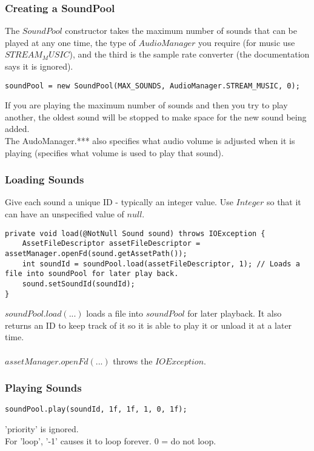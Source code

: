 \documentclass[]{article}
\begin{document}
\subsubsection{Creating a SoundPool}
The $SoundPool$ constructor takes the maximum number of sounds that can be played at any one time, the type of $AudioManager$ you require (for music use $STREAM_MUSIC$), and the third is the sample rate converter (the documentation says it is ignored).
\begin{lstlisting}
soundPool = new SoundPool(MAX_SOUNDS, AudioManager.STREAM_MUSIC, 0);
\end{lstlisting}
If you are playing the maximum number of sounds and then you try to play another, the oldest sound will be stopped to make space for the new sound being added.
\\
The AudoManager.*** also specifies what audio volume is adjusted when it is playing (specifies what volume is used to play that sound).

\subsubsection{Loading Sounds}
Give each sound a unique ID - typically an integer value.  Use $Integer$ so that it can have an unspecified value of $null$.
\begin{lstlisting}
private void load(@NotNull Sound sound) throws IOException {
	AssetFileDescriptor assetFileDescriptor = assetManager.openFd(sound.getAssetPath());
	int soundId = soundPool.load(assetFileDescriptor, 1); // Loads a file into soundPool for later play back.
	sound.setSoundId(soundId);
}
\end{lstlisting}
$soundPool.load(...)$ loads a file into $soundPool$ for later playback.  It also returns an ID to keep track of it so it is able to play it or unload it at a later time.
\\\\
$assetManager.openFd(...)$ throws the $IOException$.

\subsubsection{Playing Sounds}
\begin{lstlisting}
soundPool.play(soundId, 1f, 1f, 1, 0, 1f);
\end{lstlisting}
'priority' is ignored.
\\
For 'loop', '-1' causes it to loop forever.  0 = do not loop.

\end{document}

